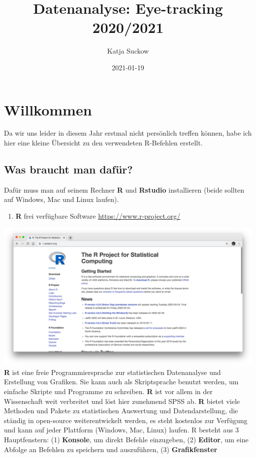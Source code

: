 \documentclass[]{book}
\title{Datenanalyse: Eye-tracking 2020/2021}
\author{Katja Suckow}
\date{2021-01-19}
\providecommand{\tightlist}{%
  \setlength{\itemsep}{0pt}\setlength{\parskip}{0pt}}
\begin{document}
\maketitle

{
\setcounter{tocdepth}{1}
\tableofcontents
}
\chapter{Willkommen}\label{willkommen}

Da wir uns leider in diesem Jahr erstmal nicht persönlich treffen
können, habe ich hier eine kleine Übersicht zu den verwendeten
R-Befehlen erstellt.

\section{Was braucht man dafür?}\label{was-braucht-man-dafuxfcr}

Dafür muss man auf seinem Rechner \textbf{R} und \textbf{Rstudio}
installieren (beide sollten auf Windows, Mac und Linux laufen).

\begin{enumerate}
\def\labelenumi{\arabic{enumi}.}
\tightlist
\item
  \textbf{R} frei verfügbare Software \url{https://www.r-project.org/}
\end{enumerate}

\includegraphics{./img/Rdownload.png} \textbf{R} ist eine freie
Programmiersprache zur statistischen Datenanalyse und Erstellung von
Grafiken. Sie kann auch als Skriptsprache benutzt werden, um einfache
Skripte und Programme zu schreiben. \textbf{R} ist vor allem in der
Wissenschaft weit verbreitet und löst hier zunehmend SPSS ab. \textbf{R}
bietet viele Methoden und Pakete zu statistischen Auswertung und
Datendarstellung, die ständig in open-source weiterentwickelt werden, es
steht kostenlos zur Verfügung und kann auf jeder Plattform (Windows,
Mac, Linux) laufen. R besteht aus 3 Hauptfenstern: (1) \textbf{Konsole},
um direkt Befehle einzugeben, (2) \textbf{Editor}, um eine Abfolge an
Befehlen zu speichern und auszuführen, (3) \textbf{Grafikfenster}
\end{document}
